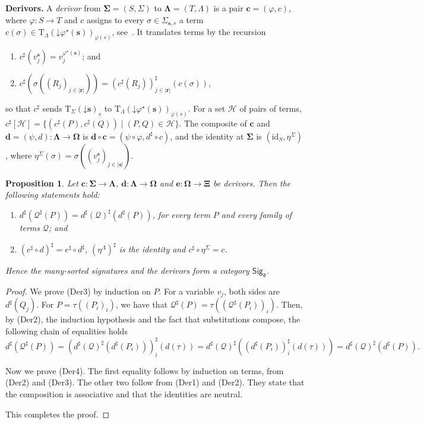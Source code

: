 \documentclass[a4paper,reqno]{amsart}
\newcommand{\bb}[1]{\lvert #1 \rvert}           %
\newcommand{\vs}[1]{\mathbin{\downarrow}#1}      %
\newcommand{\sig}[1]{\mathbf{#1}}                %
\newcommand{\id}{\mathrm{id}}
\newcommand{\mor}{\to}
\newcommand{\T}{\mathrm{T}}
\theoremstyle{plain}
\newtheorem{proposition}[theorem]{Proposition}
\theoremstyle{definition}
\begin{document}
\textbf{Derivors.}
A \emph{derivor} from $\sig{\Sigma}=(S,\Sigma)$ to $\sig{\Lambda}=(T,\Lambda)$ is a pair $\mathbf{c}=(\varphi,c)$, where $\varphi\colon S\mor T$ and $c$ assigns to every $\sigma\in\Sigma_{\mathbf{s},s}$ a term $c(\sigma)\in\T_{\Lambda}(\vs{\varphi^{\star}(\mathbf{s})})_{\varphi(s)}$, see~\cite{CVST10b}.
It translates terms by the recursion
\begin{enumerate}
\item[(Der1)] $c^{\sharp}(v^{\mathbf{s}}_{j})=v^{\varphi^{\star}(\mathbf{s})}_{j}$; and
\item[(Der2)] $c^{\sharp}(\sigma((R_{j})_{j\in\bb{\mathbf{r}}}))=(c^{\sharp}(R_{j}))^{\sharp}_{j\in\bb{\mathbf{r}}}(c(\sigma))$,
\end{enumerate}
so that $c^{\sharp}$ sends $\T_{\Sigma}(\vs{\mathbf{s}})_{s}$ to $\T_{\Lambda}(\vs{\varphi^{\star}(\mathbf{s})})_{\varphi(s)}$.
For a set $\mathcal{H}$ of pairs of terms, $c^{\sharp}[\mathcal{H}]=\{(c^{\sharp}(P),c^{\sharp}(Q))\mid(P,Q)\in\mathcal{H}\}$.
The composite of $\mathbf{c}$ and $\mathbf{d}=(\psi,d)\colon\sig{\Lambda}\mor\sig{\Omega}$ is $\mathbf{d}\circ\mathbf{c}=(\psi\circ\varphi,d^{\sharp}\circ c)$, and the identity at $\sig{\Sigma}$ is $(\id_{S},\eta^{\Sigma})$, where $\eta^{\Sigma}(\sigma)=\sigma((v^{\mathbf{s}}_{j})_{j\in\bb{\mathbf{s}}})$.

\begin{proposition}\label{PDerivors}
Let $\mathbf{c}\colon\sig{\Sigma}\mor\sig{\Lambda}$, $\mathbf{d}\colon\sig{\Lambda}\mor\sig{\Omega}$ and $\mathbf{e}\colon\sig{\Omega}\mor\sig{\Xi}$ be derivors.
Then the following statements hold:
\begin{enumerate}
\item[(Der3)] $d^{\sharp}(\mathcal{Q}^{\sharp}(P))=d^{\sharp}(\mathcal{Q})^{\sharp}(d^{\sharp}(P))$, for every term $P$ and every family of terms $\mathcal{Q}$; and
\item[(Der4)] $(e^{\sharp}\circ d)^{\sharp}=e^{\sharp}\circ d^{\sharp}$, $(\eta^{\Lambda})^{\sharp}$ is the identity and $c^{\sharp}\circ\eta^{\Sigma}=c$.
\end{enumerate}
Hence the many-sorted signatures and the derivors form a category $\mathsf{Sig}_{\mathfrak{d}}$.
\end{proposition}
\begin{proof}
We prove (Der3) by induction on $P$.
For a variable $v_{j}$, both sides are $d^{\sharp}(Q_{j})$.
For $P=\tau((P_{i})_{i})$, we have that $\mathcal{Q}^{\sharp}(P)=\tau((\mathcal{Q}^{\sharp}(P_{i}))_{i})$.
Then, by (Der2), the induction hypothesis and the fact that substitutions compose, the following chain of equalities holds
$$
d^{\sharp}(\mathcal{Q}^{\sharp}(P))
=\left(d^{\sharp}(\mathcal{Q})^{\sharp}(d^{\sharp}(P_{i}))\right)^{\sharp}_{i}(d(\tau))
=d^{\sharp}(\mathcal{Q})^{\sharp}\left((d^{\sharp}(P_{i}))^{\sharp}_{i}(d(\tau))\right)
=d^{\sharp}(\mathcal{Q})^{\sharp}(d^{\sharp}(P)).
$$

Now we prove (Der4).
The first equality follows by induction on terms, from (Der2) and (Der3).
The other two follow from (Der1) and (Der2).
They state that the composition is associative and that the identities are neutral.

This completes the proof.
\end{proof}
\end{document}
